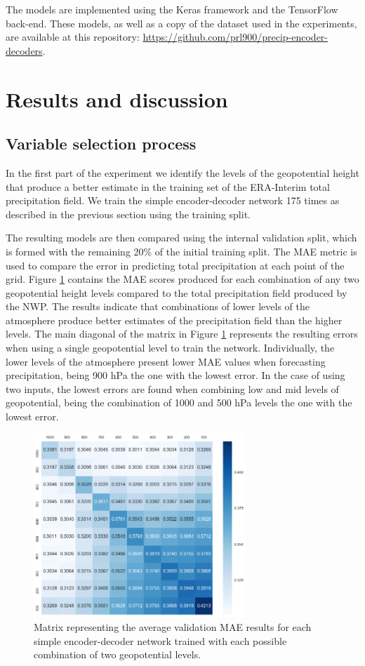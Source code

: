 \documentclass[twocol]{ametsoc}
\begin{document}
The models are implemented using the Keras \citep{chollet2017keras} framework and the TensorFlow \citep{abadi2016tensorflow} back-end. These models, as well as a copy of the dataset used in the experiments, are available at this repository: \url{https://github.com/prl900/precip-encoder-decoders}.

\section{Results and discussion}

\subsection{Variable selection process}

In the first part of the experiment we identify the levels of the geopotential height that produce a better estimate in the training set of the ERA-Interim total precipitation field. We train the simple encoder-decoder network 175 times as described in the previous section using the training split. 

The resulting models are then compared using the internal validation split, which is formed with the remaining 20\% of the initial training split. The MAE metric is used to compare the error in predicting total precipitation at each point of the grid. Figure \ref{heatmap} contains the MAE scores produced for each combination of any two geopotential height levels compared to the total precipitation field produced by the NWP. The results indicate that combinations of lower levels of the atmosphere produce better estimates of the precipitation field than the higher levels. The main diagonal of the matrix in Figure \ref{heatmap} represents the resulting errors when using a single geopotential level to train the network. Individually, the lower levels of the atmosphere present lower MAE values when forecasting precipitation, being 900 hPa the one with the lowest error. In the case of using two inputs, the lowest errors are found when combining low and mid levels of geopotential, being the combination of 1000 and 500 hPa levels the one with the lowest error.

\begin{figure}[h]
 \centerline{\includegraphics[width=8cm]{heatmap.png}}
  \caption{Matrix representing the average validation MAE results for each simple encoder-decoder network trained with each possible combination of two geopotential levels.}\label{heatmap}
\end{figure}
\end{document}
